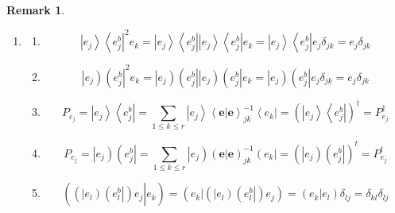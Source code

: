 \documentclass[aps,preprint]{revtex4}%
\newtheorem{remark}[theorem]{Remark}
\begin{document}
\begin{remark}
\begin{enumerate}
\item
\begin{enumerate}
\item
\begin{equation}
\left\vert e_{j}\right\rangle \left\langle e_{j}^{b}\right\vert ^{2}%
e_{k}=\left\vert e_{j}\right\rangle \left\langle e_{j}^{b}\right\vert
\left\vert e_{j}\right\rangle \left\langle e_{j}^{b}\right\vert e_{k}%
=\left\vert e_{j}\right\rangle \left\langle e_{j}^{b}\right\vert e_{j}%
\delta_{jk}=e_{j}\delta_{jk}%
\end{equation}


\item
\begin{equation}
\left\vert e_{j}\right)  \left(  e_{j}^{b}\right\vert ^{2}e_{k}=\left\vert
e_{j}\right)  \left(  e_{j}^{b}\right\vert \left\vert e_{j}\right)  \left(
e_{j}^{b}\right\vert e_{k}=\left\vert e_{j}\right)  \left(  e_{j}%
^{b}\right\vert e_{j}\delta_{jk}=e_{j}\delta_{jk}%
\end{equation}


\item
\begin{equation}
P_{e_{j}}=\left\vert e_{j}\right\rangle \left\langle e_{j}^{b}\right\vert
=\sum_{1\leq k\leq r}\left\vert e_{j}\right\rangle \left\langle \left.
\mathbf{e}\right\vert \mathbf{e}\right\rangle _{jk}^{-1}\left\langle
e_{k}\right\vert =\left(  \left\vert e_{j}\right\rangle \left\langle e_{j}%
^{b}\right\vert \right)  ^{\dagger}=P_{e_{j}}^{\dagger}%
\end{equation}


\item
\begin{equation}
P_{e_{j}}=\left\vert e_{j}\right)  \left(  e_{j}^{b}\right\vert =\sum_{1\leq
k\leq r}\left\vert e_{j}\right)  \left(  \left.  \mathbf{e}\right\vert
\mathbf{e}\right)  _{jk}^{-1}\left(  e_{k}\right\vert =\left(  \left\vert
e_{j}\right)  \left(  e_{j}^{b}\right\vert \right)  ^{t}=P_{e_{j}}^{t}%
\end{equation}


\item
\begin{equation}
\left(  \left.  \overset{}{\left(  \left\vert e_{l}\right)  \left(  e_{l}%
^{b}\right\vert \right)  }e_{j}\right\vert e_{k}\right)  =\left(  \left.
\overset{}{e_{k}}\right\vert \left(  \left\vert e_{l}\right)  \left(
e_{l}^{b}\right\vert \right)  e_{j}\right)  =\left(  \left.  \overset{}{e_{k}%
}\right\vert e_{l}\right)  \delta_{lj}=\delta_{kl}\delta_{lj}%
\end{equation}



\end{enumerate}
\end{enumerate}
\end{remark}
\end{document}
